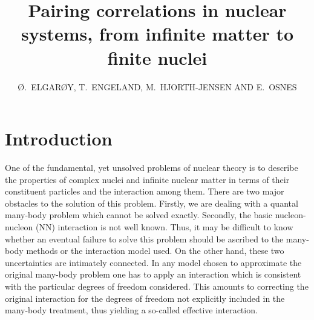 \documentclass{ws-p9-75x6-50}
\begin{document}
\title{Pairing correlations in nuclear systems, from infinite matter to 
       finite nuclei}

\author{\O.\ ELGAR\O Y, T.\ ENGELAND, M.\ HJORTH-JENSEN AND E.\ OSNES}

\address{Department of Physics, University og Oslo, N-0316 Oslo, Norway}


\maketitle


\section{Introduction}


One of the fundamental, yet unsolved problems of nuclear theory is to describe the properties of
 complex nuclei and infinite nuclear matter
in terms of their constituent particles and the interaction among them.
There are two major obstacles to the solution of this problem. Firstly, we are dealing
with a quantal many-body problem which cannot be solved exactly. Secondly, the basic
nucleon-nucleon (NN) interaction is not well known. Thus, it may be difficult to know 
whether an eventual failure to solve this problem should be ascribed to the many-body 
methods or the interaction model used. On the other hand, these two uncertainties are 
intimately connected. In any model chosen to approximate the original many-body problem
one has to apply an interaction which is consistent with the particular degrees of freedom 
considered. This amounts to correcting the original interaction for the degrees of freedom 
not explicitly included in the many-body treatment, thus yielding a so-called effective interaction.
\end{document}
